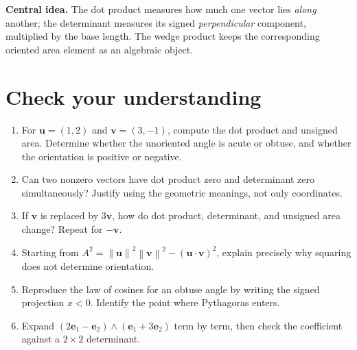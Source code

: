 \documentclass[11pt,letterpaper]{article}
\newcommand{\vect}[1]{\boldsymbol{#1}}
\newcommand{\norm}[1]{\left\lVert #1\right\rVert}
\begin{document}
\textbf{Central idea.} The dot product measures how much one vector lies \emph{along} another; the determinant measures its signed \emph{perpendicular} component, multiplied by the base length. The wedge product keeps the corresponding oriented area element as an algebraic object.

\newpage
\section*{Check your understanding}
\begin{enumerate}
\item For $\vect u=(1,2)$ and $\vect v=(3,-1)$, compute the dot product and unsigned area. Determine whether the unoriented angle is acute or obtuse, and whether the orientation is positive or negative.
\item Can two nonzero vectors have dot product zero and determinant zero simultaneously? Justify using the geometric meanings, not only coordinates.
\item If $\vect v$ is replaced by $3\vect v$, how do dot product, determinant, and unsigned area change? Repeat for $-\vect v$.
\item Starting from $A^2=\norm{\vect u}^2\norm{\vect v}^2-(\vect u\cdot\vect v)^2$, explain precisely why squaring does not determine orientation.
\item Reproduce the law of cosines for an obtuse angle by writing the signed projection $x<0$. Identify the point where Pythagoras enters.
\item Expand $(2\vect e_1-\vect e_2)\wedge(\vect e_1+3\vect e_2)$ term by term, then check the coefficient against a $2\times2$ determinant.
\end{enumerate}
\end{document}
